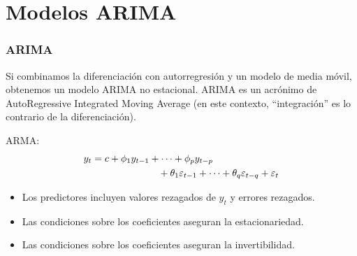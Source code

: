 \documentclass[10pt]{beamer}
\begin{document}


\section{Modelos ARIMA}



\begin{frame}[fragile]
\frametitle{ARIMA}


\small Si combinamos la diferenciación con autorregresión y un modelo de media móvil, obtenemos un modelo ARIMA no estacional. ARIMA es un acrónimo de AutoRegressive Integrated Moving Average (en este contexto, ``integración'' es lo contrario de la diferenciación).

\begin{block}{ARMA:}
\begin{align*}
y_{t}  &=  c  +  \phi_{1}y_{t - 1}  +  \cdots  +  \phi_{p}y_{t - p} \\
& \hspace*{2.4cm}\text{} + \theta_{1}\varepsilon_{t - 1} +  \cdots  + \theta_{q}\varepsilon_{t - q} +  \varepsilon_{t}
\end{align*}
\end{block}

\vspace{4mm}


\begin{itemize}
\item Los predictores incluyen valores rezagados de $y_t$ y errores rezagados.
\item Las condiciones sobre los coeficientes aseguran la estacionariedad.
\item Las condiciones sobre los coeficientes aseguran la invertibilidad.
\end{itemize}

\end{frame}


\end{document}

